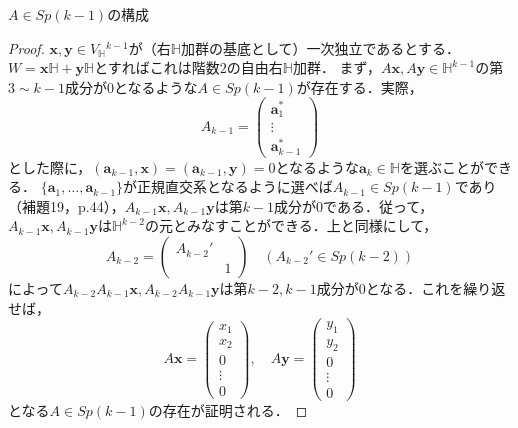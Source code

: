 \documentclass[a4paper, leqno]{ltjsreport}
\begin{document}
\begin{screen}
  $A \in Sp(k-1)$の構成
\end{screen}
\begin{proof}
  $\boldsymbol{x}, \boldsymbol{y} \in V_\mathbb{H}{}^{k-1}$が（右$\mathbb{H}$加群の基底として）一次独立であるとする．
  $W = \boldsymbol{x}\mathbb{H} + \boldsymbol{y}\mathbb{H}$とすればこれは階数$2$の自由右$\mathbb{H}$加群．
  まず，$A\boldsymbol{x}, A\boldsymbol{y} \in \mathbb{H}^{k-1}$の第$3 \sim k-1$成分が$0$となるような$A \in Sp(k-1)$が存在する．実際，
  \[A_{k-1} = \begin{pmatrix} \boldsymbol{a}_1^\ast \\ \vdots \\ \boldsymbol{a}_{k-1}^\ast \end{pmatrix}\]
  とした際に，$(\boldsymbol{a}_{k-1}, \boldsymbol{x}) = (\boldsymbol{a}_{k-1}, \boldsymbol{y}) = 0$となるような$\boldsymbol{a}_k \in \mathbb{H}$を選ぶことができる．
  $\{\boldsymbol{a}_1, \ldots, \boldsymbol{a}_{k-1}\}$が正規直交系となるように選べば$A_{k-1} \in Sp(k-1)$であり（補題19，p.44），$A_{k-1}\boldsymbol{x}, A_{k-1}\boldsymbol{y}$は第$k-1$成分が$0$である．従って，$A_{k-1}\boldsymbol{x}, A_{k-1}\boldsymbol{y}$は$\mathbb{H}^{k-2}$の元とみなすことができる．上と同様にして，
  \[A_{k-2} = \begin{pmatrix} A_{k-2}' & \\ & 1 \end{pmatrix}\quad (A_{k-2}' \in Sp(k-2))\]
  によって$A_{k-2}A_{k-1}\boldsymbol{x}, A_{k-2}A_{k-1}\boldsymbol{y}$は第$k-2, k-1$成分が$0$となる．これを繰り返せば，
  \[A\boldsymbol{x} = \begin{pmatrix} x_1 \\ x_2 \\ 0 \\ \vdots \\ 0 \end{pmatrix}, \quad A\boldsymbol{y} = \begin{pmatrix} y_1 \\ y_2 \\ 0 \\ \vdots \\ 0 \end{pmatrix}\]
  となる$A \in Sp(k-1)$の存在が証明される．


\end{proof}
\end{document}
